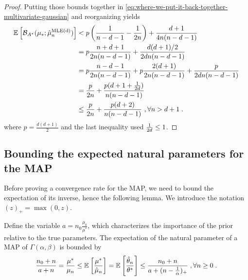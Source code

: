 \begin{proof}
Putting those bounds together in 
\cref{eq:where-we-put-it-back-together-multivariate-gaussian}
and reorganizing yields
\begin{align}
 	\mathbb{E}_{} \left[ {\mathcal B}_{A^*}( \mu_*; \hat \mu_n^\text{MLE(d)}) \right] 
 	&< p \left( \frac{1}{n-d-1} - \frac{1}{2n}\right)  + \frac{d + 1}{4n(n - d - 1)}\\
 	&= p \frac{n + d +1}{2 n (n-d-1)}  + \frac{d(d + 1)/2}{2dn(n - d - 1)}\\
 	&= p\frac{n-d-1}{2n(n-d-1)} + p\frac{2(d+1)}{2 n (n-d-1)} + \frac{p}{2dn (n - d - 1)}\\
 	&= \frac{p}{2n} + \frac{p(d+ 1 + \frac{1}{2d})}{n (n-d-1)} \\
 	&\leq \frac{p}{2n} + \frac{p(d+2)}{n (n - d -1)}
 	\ , \forall n >d+1 \;.
\end{align}
where $p = \frac{d(d+1)}{2}$ and the last inequality used $\frac{1}{2d}\leq 1$. 
\end{proof}

\subsection{Bounding the expected natural parameters for the MAP}
\label{app:nat-bound}
Before proving a convergence rate for the MAP, we need to bound the expectation of its inverse, hence the following lemma.
We introduce the notation $(z)_+ = \max(0,z)$.
\begin{lemma}\label{lem:expected-map-natural-parameter-gaussian}
	Define the variable $a = n_0 \frac{\mu_0}{\mu^*}$, which characterizes 
	the importance of the prior relative to the true parameters.
	The expectation of the natural parameter of a MAP of $\Gamma(\alpha,\beta)$ is bounded by
\begin{equation}
		\frac{n_0+n}{a+n}
		=\frac{\mu^*}{\mu_n}
		\leq \mathbb{E}_{} \left[ \frac{\mu^*}{\hat {\mu}_n} \right]  
		= \mathbb{E}_{} \left[ \frac{\hat {\theta}_n}{\theta^*} \right]  
		\leq
		\frac{n_0 +n}{a+(n-\frac{1}{\alpha} )_+} \; , \forall n\geq 0 \; .
		\label{eq:lemma_nat_bound}
	\end{equation}
\end{lemma}

